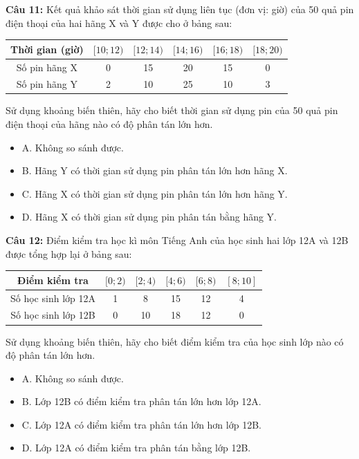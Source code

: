\documentclass[12pt]{article}
\begin{document}
	\noindent \textbf{Câu 11:} Kết quả khảo sát thời gian sử dụng liên tục (đơn vị: giờ) của 50 quả pin điện thoại của hai hãng X và Y được cho ở bảng sau:
	\begin{center}
		\renewcommand{\arraystretch}{1.3}
		\begin{tabular}{|c|c|c|c|c|c|}
			\hline
			Thời gian (giờ) & $[10; 12)$ & $[12; 14)$ & $[14; 16)$ & $[16; 18)$ & $[18; 20)$ \\
			\hline
			Số pin hãng X & 0 & 15 & 20 & 15 & 0 \\
			\hline
			Số pin hãng Y & 2 & 10 & 25 & 10 & 3 \\
			\hline
		\end{tabular}
	\end{center}
	Sử dụng khoảng biến thiên, hãy cho biết thời gian sử dụng pin của 50 quả pin điện thoại của hãng nào có độ phân tán lớn hơn.
	\begin{itemize}[label=, leftmargin=*]
		\item A. Không so sánh được.
		\item B. Hãng Y có thời gian sử dụng pin phân tán lớn hơn hãng X.
		\item C. Hãng X có thời gian sử dụng pin phân tán lớn hơn hãng Y.
		\item D. Hãng X có thời gian sử dụng pin phân tán bằng hãng Y.
	\end{itemize}
	
	\vspace{4mm}
	
	\noindent \textbf{Câu 12:} Điểm kiểm tra học kì môn Tiếng Anh của học sinh hai lớp 12A và 12B được tổng hợp lại ở bảng sau:
	\begin{center}
		\renewcommand{\arraystretch}{1.3}
		\begin{tabular}{|c|c|c|c|c|c|}
			\hline
			Điểm kiểm tra & $[0; 2)$ & $[2; 4)$ & $[4; 6)$ & $[6; 8)$ & $[8; 10]$ \\
			\hline
			Số học sinh lớp 12A & 1 & 8 & 15 & 12 & 4 \\
			\hline
			Số học sinh lớp 12B & 0 & 10 & 18 & 12 & 0 \\
			\hline
		\end{tabular}
	\end{center}
	Sử dụng khoảng biến thiên, hãy cho biết điểm kiểm tra của học sinh lớp nào có độ phân tán lớn hơn.
	\begin{itemize}[label=, leftmargin=*]
		\item A. Không so sánh được.
		\item B. Lớp 12B có điểm kiểm tra phân tán lớn hơn lớp 12A.
		\item C. Lớp 12A có điểm kiểm tra phân tán lớn hơn lớp 12B.
		\item D. Lớp 12A có điểm kiểm tra phân tán bằng lớp 12B.
	\end{itemize}
	
\end{document}
